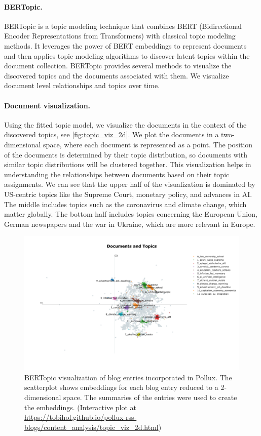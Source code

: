 \documentclass{article}
\begin{document}
\paragraph{BERTopic.}
BERTopic \citep{grootendorstBERTopicNeuralTopic2022} is a topic modeling technique that combines BERT (Bidirectional Encoder Representations from Transformers) with classical topic modeling methods. It leverages the power of BERT embeddings to represent documents and then applies topic modeling algorithms to discover latent topics within the document collection.
BERTopic provides several methods to visualize the discovered topics and the documents associated with them. We visualize document level relationships and topics over time.

\paragraph{Document visualization.}
Using the fitted topic model, we visualize the documents in the context of the discovered topics, see \autoref{fig:topic_viz_2d}. We plot the documents in a two-dimensional space, where each document is represented as a point. The position of the documents is determined by their topic distribution, so documents with similar topic distributions will be clustered together. This visualization helps in understanding the relationships between documents based on their topic assignments. We can see that the upper half of the visualization is dominated by US-centric topics like the Supreme Court, monetary policy, and advances in AI. The middle includes topics such as the coronavirus and climate change, which matter globally. The bottom half includes topics concerning the European Union, German newspapers and the war in Ukraine, which are more relevant in Europe.

\begin{figure}[!htb]
    \includegraphics[width=1.0\textwidth]{figures/topic_viz_2d.png}
    \caption{BERTopic visualization of blog entries incorporated in Pollux. The scatterplot shows embeddings for each blog entry reduced to a 2-dimensional space. The summaries of the entries were used to create the embeddings. (Interactive plot at \url{https://tobihol.github.io/pollux-rss-blogs/content_analysis/topic_viz_2d.html})}
    \label{fig:topic_viz_2d}
\end{figure}
\end{document}
